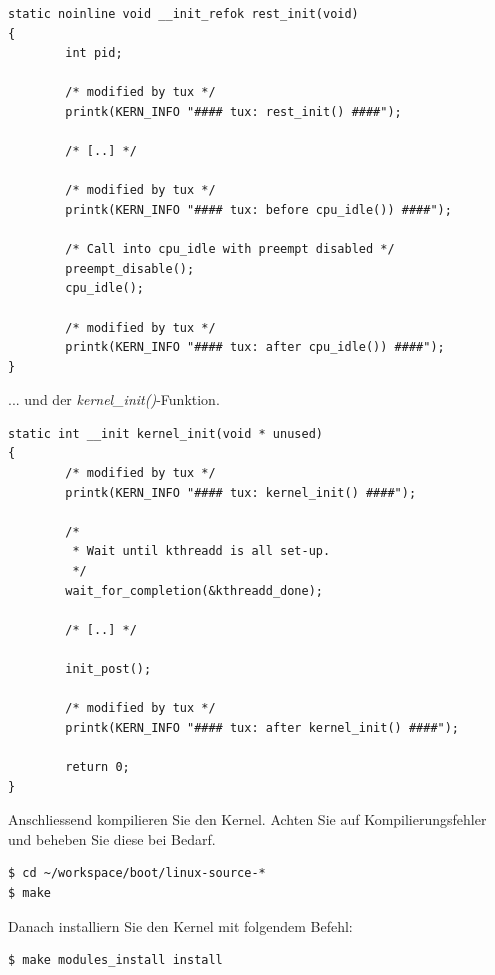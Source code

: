 \begin{lstlisting}[label=boot_rest_init,caption=init/main.c]
static noinline void __init_refok rest_init(void)
{
        int pid;

        /* modified by tux */
        printk(KERN_INFO "#### tux: rest_init() ####");

        /* [..] */

        /* modified by tux */
        printk(KERN_INFO "#### tux: before cpu_idle()) ####");

        /* Call into cpu_idle with preempt disabled */
        preempt_disable();
        cpu_idle();

        /* modified by tux */
        printk(KERN_INFO "#### tux: after cpu_idle()) ####");
}
\end{lstlisting}

... und der \emph{kernel\_init()}-Funktion.

\begin{lstlisting}[label=boot_kernel_init,caption=init/main.c]
static int __init kernel_init(void * unused)
{
        /* modified by tux */
        printk(KERN_INFO "#### tux: kernel_init() ####");

        /*
         * Wait until kthreadd is all set-up.
         */
        wait_for_completion(&kthreadd_done);

        /* [..] */

        init_post();

        /* modified by tux */
        printk(KERN_INFO "#### tux: after kernel_init() ####");

        return 0;
}
\end{lstlisting}

Anschliessend kompilieren Sie den Kernel. Achten Sie auf Kompilierungsfehler und beheben
Sie diese bei Bedarf.
\begin{lstlisting}
$ cd ~/workspace/boot/linux-source-*
$ make
\end{lstlisting}

Danach installiern Sie den Kernel mit folgendem Befehl:
\begin{lstlisting}
$ make modules_install install
\end{lstlisting}

